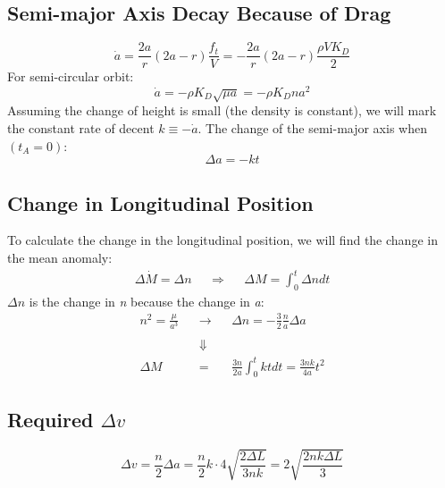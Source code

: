 \documentclass[11pt, a4paper]{article}
\begin{document}
\subsection{Semi-major Axis Decay Because of Drag}
\begin{equation}
    \dot{a}=\frac{2a}{r}\left(2a-r\right)\frac{f_t}{V}=-\frac{2a}{r}\left(2a-r\right)\frac{\rho VK_D}{2}
\end{equation}
For semi-circular orbit:
\begin{equation}
    \dot{a}=-\rho K_D\sqrt{\mu a}=-\rho K_Dna^2
\end{equation}
Assuming the change of height is small (the density is constant), we will mark the constant rate of decent $k\equiv-\dot{a}$. The change of the semi-major axis when $\left(t_A=0\right)$:
\begin{equation}
    \Delta a=-kt
\end{equation}

\subsection{Change in Longitudinal Position}
To calculate the change in the longitudinal position, we will find the change in the mean anomaly:
\begin{equation}
    \begin{matrix}
        \Delta\dot{M}=\Delta n && \Rightarrow && \Delta M=\int_0^t\Delta ndt
    \end{matrix}
\end{equation}
$\Delta n$ is the change in \emph{n} because the change in \emph{a}:
\begin{equation}
    \begin{matrix}
        \displaystyle n^2=\frac{\mu}{a^3} && \rightarrow && \displaystyle \Delta n=-\frac{3}{2}\frac{n}{a}\Delta a \\\\ && \Downarrow && \\ 
        \Delta M&& = && \displaystyle \frac{3n}{2a}\int_0^tktdt=\frac{3nk}{4a}t^2 
    \end{matrix}
\end{equation}

\subsection{Required $\Delta v$}
\begin{equation}
    \Delta v=\frac{n}{2}\Delta a=\frac{n}{2}k\cdot4\sqrt{\frac{2\Delta L}{3nk}}=2\sqrt{\frac{2nk\Delta L}{3}}
\end{equation}
\end{document}
